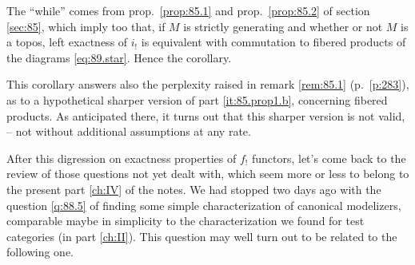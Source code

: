 The ``while'' comes from prop.\ \ref{prop:85.1} and prop.\
\ref{prop:85.2} of section \ref{sec:85}, which imply too that, if $M$ is
strictly generating and whether or not $M$ is a topos, left exactness
of $i_!$ is equivalent with commutation to fibered products of the
diagrams \eqref{eq:89.star}. Hence the corollary.

This corollary answers also the perplexity raised in remark
\ref{rem:85.1} (p.\ \ref{p:283}), as to a hypothetical sharper version
of part \ref{it:85.prop1.b}, concerning fibered products. As
anticipated there, it turns out that this sharper version is not
valid, -- not without additional assumptions at any rate.

\label{sec:90}%
After this digression on exactness properties of $f_!$ functors, let's
come back to the review of those questions not yet dealt with, which
seem more or less to belong to the present part \ref{ch:IV} of the
notes. We had stopped two days ago with the question \ref{q:88.5} of
finding some simple characterization of canonical modelizers,
comparable maybe in simplicity to the characterization we found for
test categories (in part \ref{ch:II}). This question may well turn out
to be related to the following one.

